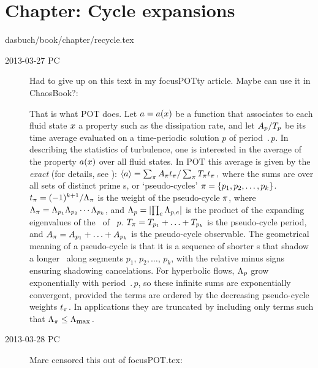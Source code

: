 \section{Chapter: Cycle expansions}
\label{c-recycle}\noindent dasbuch/book/chapter/recycle.tex
\begin{description}
\item[2013-03-27 PC] Had to give up on
this text in my focusPOTty article. Maybe can use it in
ChaosBook?:

That is what POT does. Let $a = a(x)$ be a function that
associates to each fluid state $x$ a property such as the
dissipation rate, and let \({A_p}/{{T_{p}}}\)
be its time
average evaluated on a time-periodic solution $p$ of period
$\period{p}$. In describing the statistics of turbulence, one is
interested in the average of the property $a(x)$ over all
fluid states. In POT this average is given by
the \emph{exact
\cycForm} (for details, see \wwwcb{}): \(\left\langle {\ensuremath{a}} \right\rangle =
\sum_\pi A_{\pi}t_\pi
/\sum_\pi{\ensuremath{T_{\pi}}}t_\pi\,,\) where the sums are
over all sets of distinct prime \po s, or `pseudo-cycles'
$\pi = \{ p_1, p_2, \dots, p_k \}$.
\(t_\pi  = (-1)^{k+1} /\Lambda_\pi\)
is the weight of the pseudo-cycle $\pi$, where
\(\Lambda_{\pi} =
\Lambda_{p_1}\Lambda_{p_2} \cdots \Lambda_{p_{k}}\), and
\(\Lambda_{p} = \left|\prod_e \Lambda_{p,e}\right|\)
is the product
of the expanding eigenvalues of the \jacobianM\ of \po\ $p$.
\(
{T_{\pi}}={T_{p_1}}+ \ldots + {T_{p_{k}}}
\) is the pseudo-cycle period, and
\(
A_\pi = A_{p_1}+ \ldots + A_{p_{k}}
\) is the pseudo-cycle  observable.
The geometrical meaning of a pseudo-cycle is that it is a sequence of
shorter \po s that shadow a longer \po\ along segments $p_1$,
$p_2, \dots$, $p_k$, with the relative minus signs ensuring shadowing
cancelations. For hyperbolic flows, $\Lambda_p$ grow exponentially
with period $\period{p}$, so these infinite sums are exponentially
convergent, provided the terms are ordered by the decreasing
pseudo-cycle weights $t_\pi$. In applications they are truncated
by including only terms such that
\(\Lambda_{\pi}\leq\Lambda_{\mbox{\footnotesize max}}\,.\)


\item[2013-03-28 PC]                \toCB
Marc censored this out of focusPOT.tex:


\end{description}
